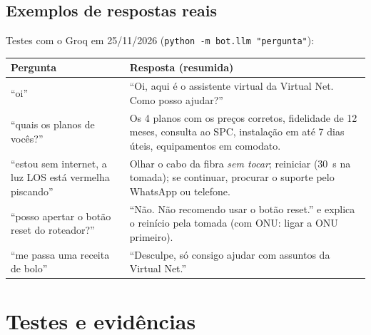 \documentclass[11pt,a4paper]{article}
\newcommand{\cod}[1]{\texttt{#1}}
\begin{document}
\subsection{Exemplos de respostas reais}
Testes com o Groq em 25/11/2026 (\cod{python -m bot.llm "pergunta"}):
\begin{center}
\small
\begin{tabularx}{\linewidth}{>{\raggedright\arraybackslash}p{4.2cm} X}
\toprule
\textbf{Pergunta} & \textbf{Resposta (resumida)} \\
\midrule
``oi'' & ``Oi, aqui é o assistente virtual da Virtual Net. Como posso ajudar?'' \\
``quais os planos de vocês?'' & Os 4 planos com os preços corretos, fidelidade de 12 meses, consulta ao
SPC, instalação em até 7 dias úteis, equipamentos em comodato. \\
``estou sem internet, a luz LOS está vermelha piscando'' & Olhar o cabo da fibra \emph{sem tocar};
reiniciar (30~s na tomada); se continuar, procurar o suporte pelo WhatsApp ou telefone. \\
``posso apertar o botão reset do roteador?'' & ``Não. Não recomendo usar o botão reset.'' e explica o
reinício pela tomada (com ONU: ligar a ONU primeiro). \\
``me passa uma receita de bolo'' & ``Desculpe, só consigo ajudar com assuntos da Virtual Net.'' \\
\bottomrule
\end{tabularx}
\end{center}

\section{Testes e evidências}\label{sec:testes}
\end{document}
